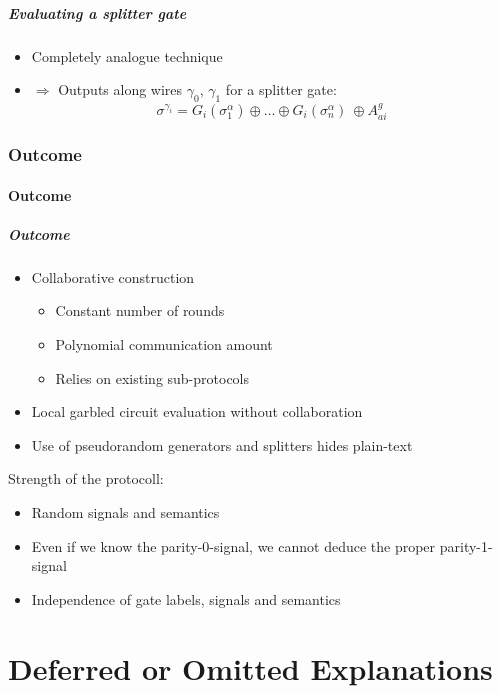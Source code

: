 \documentclass{beamer}
\begin{document}
\begin{frame}
  \frametitle{Evaluating a splitter gate}
  \begin{itemize}
  \item Completely analogue technique
  \item $\Rightarrow$ Outputs along wires $\gamma_0$, $\gamma_1$ for a splitter gate:
    \begin{equation*}
      \sigma^{\gamma_i}=G_i(\sigma_1^\alpha)\oplus\dots\oplus G_i(\sigma_n^\alpha) \ \oplus A_{ai}^g
    \end{equation*}
  \end{itemize}
\end{frame}

\section{Outcome}

\subsection{Outcome}
\label{sec:outcome}

\begin{frame}
  \frametitle{Outcome}
  \begin{itemize}
  \item Collaborative construction
    \begin{itemize}
    \item Constant number of rounds
    \item Polynomial communication amount
    \item Relies on existing sub-protocols
    \end{itemize}
  \item Local garbled circuit evaluation without collaboration
  \item Use of pseudorandom generators and splitters hides plain-text
  \end{itemize}
  Strength of the protocoll:
  \begin{itemize}
  \item Random signals and semantics
  \item Even if we know the parity-0-signal, we cannot deduce the proper parity-1-signal
  \item Independence of gate labels, signals and semantics
  \end{itemize}
\end{frame}

\part{Deferred or Omitted Explanations}
\label{part:deferred-explanations}
\end{document}
